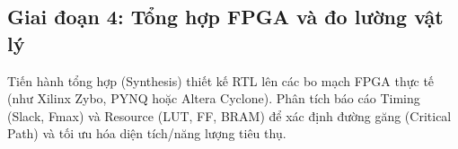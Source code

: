 \subsection{Giai đoạn 4: Tổng hợp FPGA và đo lường vật lý}
Tiến hành tổng hợp (Synthesis) thiết kế RTL lên các bo mạch FPGA thực tế (như Xilinx Zybo, PYNQ hoặc Altera Cyclone). Phân tích báo cáo Timing (Slack, Fmax) và Resource (LUT, FF, BRAM) để xác định đường găng (Critical Path) và tối ưu hóa diện tích/năng lượng tiêu thụ.
